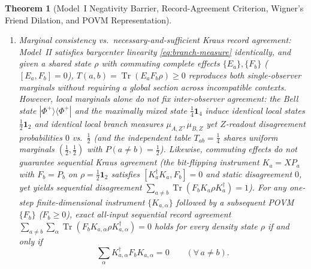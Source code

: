 \documentclass[11pt,a4paper]{article}
\newtheorem{theorem}{Theorem}
\theoremstyle{definition}
\theoremstyle{remark}
\newcommand{\Tr}{\operatorname{Tr}}
\newcommand{\1}{\mathbf{1}}
\begin{document}
\begin{theorem}[Model~I Negativity Barrier, Record-Agreement Criterion, Wigner's Friend Dilation, and POVM Representation]
\begin{enumerate}
\begin{enumerate}
    \item[(b.1)] \emph{Marginal consistency vs.\ necessary-and-sufficient Kraus record agreement:} Model~II satisfies barycenter linearity \eqref{eq:branch-measure} identically, and given a shared state $\rho$ with commuting complete effects $\{E_a\},\{F_b\}$ ($[E_a,F_b]=0$), $T(a,b)=\Tr(E_a F_b\rho)\ge 0$ reproduces both single-observer marginals without requiring a global section across incompatible contexts. However, local marginals alone do \emph{not} fix inter-observer agreement: the Bell state $|\Phi^+\rangle\langle\Phi^+|$ and the maximally mixed state $\frac{1}{4}\1_4$ induce identical local states $\frac{1}{2}\1_2$ and identical local branch measures $\mu_{A,Z},\mu_{B,Z}$ yet $Z$-readout disagreement probabilities $0$ vs.\ $\frac{1}{2}$ (and the independent table $T_{ab}=\frac{1}{4}$ shares uniform marginals $(\frac{1}{2},\frac{1}{2})$ with $P(a\neq b)=\frac{1}{2}$). Likewise, commuting effects do \emph{not} guarantee sequential Kraus agreement (the bit-flipping instrument $K_a=X P_a$ with $F_b=P_b$ on $\rho=\frac{1}{2}\1_2$ satisfies $[K_a^\dagger K_a,F_b]=0$ and static disagreement $0$, yet yields sequential disagreement $\sum_{a\neq b}\Tr(F_b K_a\rho K_a^\dagger)=1$). For any one-step finite-dimensional instrument $\{K_{a,\alpha}\}$ followed by a subsequent POVM $\{F_b\}$ ($F_b\ge 0$), exact all-input sequential record agreement $\sum_{a\neq b}\sum_\alpha\Tr(F_b K_{a,\alpha}\rho K_{a,\alpha}^\dagger)=0$ holds for every density state $\rho$ \emph{if and only if}
    \begin{equation}\label{eq:kraus-record-orthog}
      \sum_\alpha K_{a,\alpha}^\dagger F_b K_{a,\alpha} = 0 \qquad (\forall\, a\neq b).
    \end{equation}

\end{enumerate}
\end{enumerate}
\end{theorem}
\end{document}
